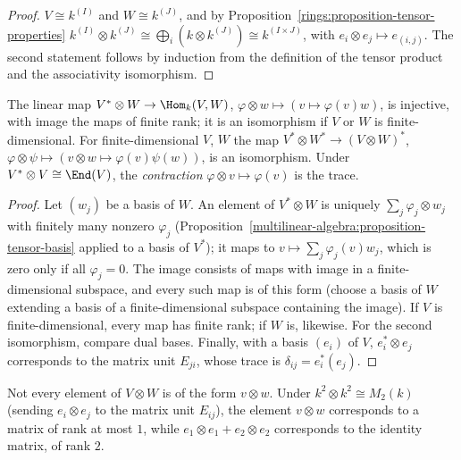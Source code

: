\begin{proof}
$V \cong k^{(I)}$ and $W \cong k^{(J)}$, and by Proposition~\ref{rings:proposition-tensor-properties}
$k^{(I)} \otimes k^{(J)} \cong \bigoplus_{i} (k \otimes k^{(J)}) \cong k^{(I \times J)}$, with $e_i \otimes e_j \mapsto e_{(i,j)}$. The second
statement follows by induction from the definition of the tensor product and the associativity
isomorphism.
\end{proof}

\begin{proposition}\label{multilinear-algebra:proposition-hom-tensor}
The linear map $V^* \otimes W \to \Hom_k(V, W)$, $\varphi \otimes w \mapsto (v \mapsto \varphi(v)w)$, is injective, with image the
maps of finite rank; it is an isomorphism if $V$ or $W$ is finite-dimensional. For finite-dimensional
$V$, $W$ the map $V^* \otimes W^* \to (V \otimes W)^*$, $\varphi \otimes \psi \mapsto (v \otimes w \mapsto \varphi(v)\psi(w))$, is an
isomorphism. Under $V^* \otimes V \cong \End(V)$, the \emph{contraction} $\varphi \otimes v \mapsto \varphi(v)$ is the trace.
\end{proposition}

\begin{proof}
Let $(w_j)$ be a basis of $W$. An element of $V^* \otimes W$ is uniquely $\sum_j \varphi_j \otimes w_j$ with finitely
many nonzero $\varphi_j$ (Proposition~\ref{multilinear-algebra:proposition-tensor-basis} applied to a
basis of $V^*$); it maps to $v \mapsto \sum_j \varphi_j(v)w_j$, which is zero only if all $\varphi_j = 0$. The image
consists of maps with image in a finite-dimensional subspace, and every such map is of this form
(choose a basis of $W$ extending a basis of a finite-dimensional subspace containing the image). If $V$
is finite-dimensional, every map has finite rank; if $W$ is, likewise. For the second isomorphism,
compare dual bases. Finally, with a basis $(e_i)$ of $V$, $e_i^* \otimes e_j$ corresponds to the matrix unit
$E_{ji}$, whose trace is $\delta_{ij} = e_i^*(e_j)$.
\end{proof}

\begin{counterexample}\label{multilinear-algebra:counterexample-indecomposable}
Not every element of $V \otimes W$ is of the form $v \otimes w$. Under $k^2 \otimes k^2 \cong M_2(k)$ (sending
$e_i \otimes e_j$ to the matrix unit $E_{ij}$), the element $v \otimes w$ corresponds to a matrix of rank at most
$1$, while $e_1 \otimes e_1 + e_2 \otimes e_2$ corresponds to the identity matrix, of rank $2$.
\end{counterexample}

